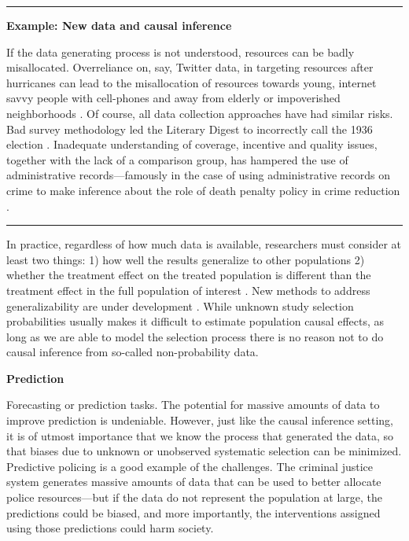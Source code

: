 \documentclass[]{krantz}
\begin{document}
\begin{center}\rule{0.5\linewidth}{\linethickness}\end{center}

\textbf{Example: New data and causal inference}

If the data generating process is not understood, resources can be badly
misallocated. Overreliance on, say, Twitter data, in targeting resources
after hurricanes can lead to the misallocation of resources towards
young, internet savvy people with cell-phones and away from elderly or
impoverished neighborhoods \citep{shelton2014mapping}. Of course, all
data collection approaches have had similar risks. Bad survey
methodology led the Literary Digest to incorrectly call the 1936
election \citep{squire19881936}. Inadequate understanding of coverage,
incentive and quality issues, together with the lack of a comparison
group, has hampered the use of administrative records---famously in the
case of using administrative records on crime to make inference about
the role of death penalty policy in crime reduction
\citep{donohue2006uses}.

\begin{center}\rule{0.5\linewidth}{\linethickness}\end{center}

In practice, regardless of how much data is available, researchers must
consider at least two things: 1) how well the results generalize to
other populations \citep{athey2017state} 2) whether the treatment effect
on the treated population is different than the treatment effect in the
full population of interest \citep{stuart2010matching}. New methods to
address generalizability are under development
\citep{dugoff2014generalizing}. While unknown study selection
probabilities usually makes it difficult to estimate population causal
effects, as long as we are able to model the selection process there is
no reason not to do causal inference from so-called non-probability
data.

\textbf{Prediction}

Forecasting or prediction tasks. The potential for massive amounts of
data to improve prediction is undeniable. However, just like the causal
inference setting, it is of utmost importance that we know the process
that generated the data, so that biases due to unknown or unobserved
systematic selection can be minimized. Predictive policing is a good
example of the challenges. The criminal justice system generates massive
amounts of data that can be used to better allocate police
resources---but if the data do not represent the population at large,
the predictions could be biased, and more importantly, the interventions
assigned using those predictions could harm society.
\end{document}
